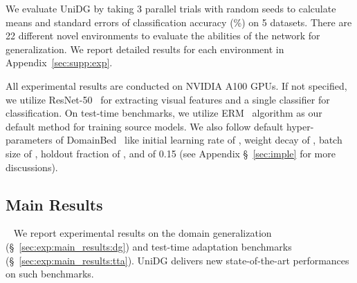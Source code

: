\documentclass{article} \usepackage{iclr2024_conference,times}
\def\Model{UniDG }
\begin{document}
\textbf{} We evaluate \Model by taking 3 parallel trials with random seeds to calculate means and standard errors of classification accuracy (\%) on 5 datasets. There are 22 different novel environments to evaluate the abilities of the network for generalization. We report detailed results for each environment in Appendix~\ref{sec:supp:exp}. \par

\textbf{} 
All experimental results are conducted on NVIDIA A100 GPUs. If not specified, we utilize ResNet-50~\citep{he2016deep} for extracting visual features and a single classifier for classification. On test-time benchmarks, we utilize ERM~\citep{vapnik1991principles} algorithm as our default method for training source models. We also follow default hyper-parameters of DomainBed~\citep{gulrajani2020search} like initial learning rate of , weight decay of , batch size of , holdout fraction of , and  of 0.15 (see Appendix \S~\ref{sec:imple} for more discussions).
\subsection{Main Results} ~\label{sec:exp:main_results}
We report experimental results on the domain generalization (\S~\ref{sec:exp:main_results:dg}) and test-time adaptation benchmarks (\S~\ref{sec:exp:main_results:tta}). \Model delivers new state-of-the-art performances on such benchmarks.
\end{document}
